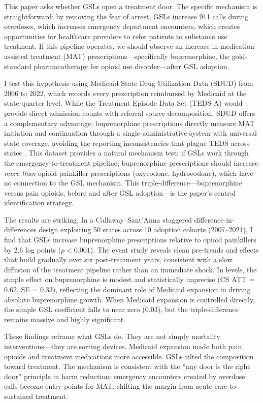 \documentclass[12pt]{article}
\begin{document}
This paper asks whether GSLs open a treatment door. The specific mechanism is straightforward: by removing the fear of arrest, GSLs increase 911 calls during overdoses, which increases emergency department encounters, which creates opportunities for healthcare providers to refer patients to substance use treatment. If this pipeline operates, we should observe an increase in medication-assisted treatment (MAT) prescriptions---specifically buprenorphine, the gold-standard pharmacotherapy for opioid use disorder---after GSL adoption.

I test this hypothesis using Medicaid State Drug Utilization Data (SDUD) from 2006 to 2022, which records every prescription reimbursed by Medicaid at the state-quarter level. While the Treatment Episode Data Set (TEDS-A) would provide direct admission counts with referral source decomposition, SDUD offers a complementary advantage: buprenorphine prescriptions directly measure MAT initiation and continuation through a single administrative system with universal state coverage, avoiding the reporting inconsistencies that plague TEDS across states \citep{saloner2018}. This dataset provides a natural mechanism test: if GSLs work through the emergency-to-treatment pipeline, buprenorphine prescriptions should increase \textit{more than} opioid painkiller prescriptions (oxycodone, hydrocodone), which have no connection to the GSL mechanism. This triple-difference---buprenorphine versus pain opioids, before and after GSL adoption---is the paper's central identification strategy.

The results are striking. In a Callaway--Sant'Anna \citeyearpar{callaway2021} staggered difference-in-differences design exploiting 50 states across 10 adoption cohorts (2007--2021), I find that GSLs increase buprenorphine prescriptions relative to opioid painkillers by 2.6 log points ($p < 0.001$). The event study reveals clean pre-trends and effects that build gradually over six post-treatment years, consistent with a slow diffusion of the treatment pipeline rather than an immediate shock. In levels, the simple effect on buprenorphine is modest and statistically imprecise (CS ATT = 0.62, SE = 0.33), reflecting the dominant role of Medicaid expansion in driving absolute buprenorphine growth. When Medicaid expansion is controlled directly, the simple GSL coefficient falls to near zero (0.03), but the triple-difference remains massive and highly significant.

These findings reframe what GSLs do. They are not simply mortality interventions---they are sorting devices. Medicaid expansion made both pain opioids and treatment medications more accessible. GSLs tilted the composition toward treatment. The mechanism is consistent with the ``any door is the right door'' principle in harm reduction: emergency encounters created by overdose calls become entry points for MAT, shifting the margin from acute care to sustained treatment.
\end{document}
